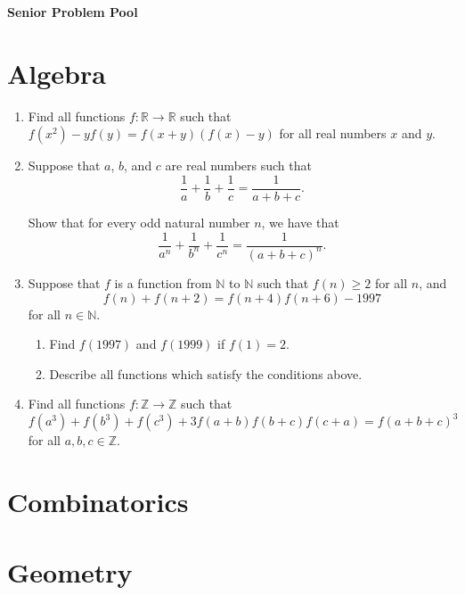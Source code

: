 \documentclass{article}
\begin{document}
\begin{center}
\textbf{\huge Senior Problem Pool}
\end{center}

\section*{Algebra}

\begin{enumerate}[1.]

\item %
Find all functions $f : \mathbb{R} \to \mathbb{R}$ such that $f(x^2) - yf(y) = f(x + y) (f(x) - y)$ for all real numbers $x$ and $y$.


\item %

Suppose that $a$, $b$, and $c$ are real numbers such that
\[
	\frac{1}{a} + \frac{1}{b} + \frac{1}{c} = \frac{1}{a + b + c}.
\]

Show that for every odd natural number $n$, we have that
\[
	\frac{1}{a^n} + \frac{1}{b^n} + \frac{1}{c^n} = \frac{1}{{(a + b + c)}^n}.
\]


\item Suppose that $f$ is a function from $\mathbb{N}$ to $\mathbb{N}$ such that $f(n) \geq 2$ for all $n$, and
\[
	f(n) + f(n + 2) = f(n + 4) f(n + 6) - 1997
\]
for all $n \in \mathbb{N}$.

\begin{enumerate}
\item Find $f(1997)$ and $f(1999)$ if $f(1) = 2$.
\item Describe all functions which satisfy the conditions above.
\end{enumerate}


\item Find all functions $f : \mathbb{Z} \to \mathbb{Z}$ such that
\[
	f(a^3) + f(b^3) + f(c^3) + 3f(a + b) f(b + c) f(c + a) = {f(a + b + c)}^3
\]
for all $a, b, c \in \mathbb{Z}$.

\end{enumerate}

\section*{Combinatorics}

\section*{Geometry}
\end{document}
